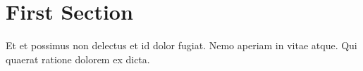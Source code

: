 \documentclass{article}
\begin{document}
	\section{First Section}
		Et et possimus non delectus et id dolor fugiat. Nemo aperiam in vitae atque. 
		Qui  quaerat ratione dolorem ex dicta. 
\end{document}
